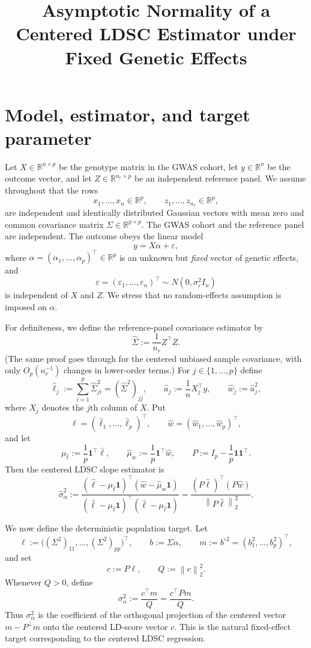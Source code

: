 \documentclass[11pt]{article}
\title{Asymptotic Normality of a Centered LDSC Estimator under Fixed Genetic Effects}
\date{}
\theoremstyle{definition}
\newcommand{\R}{\mathbb{R}}
\newcommand{\1}{\mathbf{1}}
\newcommand{\norm}[1]{\left\lVert #1 \right\rVert}
\begin{document}
\maketitle

\section*{Model, estimator, and target parameter}

Let $X\in\R^{n\times p}$ be the genotype matrix in the GWAS cohort, let $y\in\R^n$ be the outcome vector, and let $Z\in\R^{n_r\times p}$ be an independent reference panel. We assume throughout that the rows
\[
 x_1,\dots,x_n\in\R^p,
 \qquad
 z_1,\dots,z_{n_r}\in\R^p,
\]
are independent and identically distributed Gaussian vectors with mean zero and common covariance matrix $\Sigma\in\R^{p\times p}$. The GWAS cohort and the reference panel are independent. The outcome obeys the linear model
\[
 y=X\alpha+\varepsilon,
\]
where $\alpha=(\alpha_1,\dots,\alpha_p)^\top\in\R^p$ is an unknown but \emph{fixed} vector of genetic effects, and
\[
 \varepsilon=(\varepsilon_1,\dots,\varepsilon_n)^\top\sim N(0,\sigma_\varepsilon^2 I_n)
\]
is independent of $X$ and $Z$. We stress that no random-effects assumption is imposed on $\alpha$.

For definiteness, we define the reference-panel covariance estimator by
\[
 \widehat\Sigma:=\frac1{n_r}Z^\top Z.
\]
(The same proof goes through for the centered unbiased sample covariance, with only $O_p(n_r^{-1})$ changes in lower-order terms.) For $j\in\{1,\dots,p\}$ define
\[
 \widehat\ell_j:=\sum_{i=1}^p \widehat\Sigma_{ji}^2=(\widehat\Sigma^2)_{jj},
 \qquad
 \widehat a_j:=\frac1n X_j^\top y,
 \qquad
 \widehat w_j:=\widehat a_j^2,
\]
where $X_j$ denotes the $j$th column of $X$. Put
\[
 \widehat\ell=(\widehat\ell_1,\dots,\widehat\ell_p)^\top,
 \qquad
 \widehat w=(\widehat w_1,\dots,\widehat w_p)^\top,
\]
and let
\[
 \mu_{\widehat\ell}:=\frac1p\1^\top\widehat\ell,
 \qquad
 \widehat\mu_w:=\frac1p\1^\top\widehat w,
 \qquad
 P:=I_p-\frac1p\1\1^\top.
\]
Then the centered LDSC slope estimator is
\[
 \widehat\sigma_\alpha^2
 :=\frac{(\widehat\ell-\mu_{\widehat\ell}\1)^\top(\widehat w-\widehat\mu_w\1)}{(\widehat\ell-\mu_{\widehat\ell}\1)^\top(\widehat\ell-\mu_{\widehat\ell}\1)}
 =\frac{(P\widehat\ell)^\top(P\widehat w)}{\norm{P\widehat\ell}_2^2}.
\]

We now define the deterministic population target. Let
\[
 \ell:=\bigl((\Sigma^2)_{11},\dots,(\Sigma^2)_{pp}\bigr)^\top,
 \qquad
 b:=\Sigma\alpha,
 \qquad
 m:=b^{\circ 2}=(b_1^2,\dots,b_p^2)^\top,
\]
and set
\[
 c:=P\ell,
 \qquad
 Q:=\norm{c}_2^2.
\]
Whenever $Q>0$, define
\begin{equation}\label{eq:population-target}
 \sigma_\alpha^2:=\frac{c^\top m}{Q}=\frac{c^\top Pm}{Q}.
\end{equation}
Thus $\sigma_\alpha^2$ is the coefficient of the orthogonal projection of the centered vector $m-P^\perp m$ onto the centered LD-score vector $c$. This is the natural fixed-effect target corresponding to the centered LDSC regression.
\end{document}
